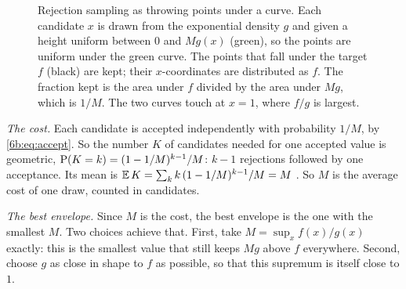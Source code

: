 \begin{figure}[htbp]
\centering
{}
\caption{Rejection sampling as throwing points under a curve. Each candidate $x$ is
drawn from the exponential density $g$ and given a height uniform between $0$ and
$Mg(x)$ (green), so the points are uniform under the green curve. The points that
fall under the target $f$ (black) are kept; their $x$-coordinates are distributed as
$f$. The fraction kept is the area under $f$ divided by the area under $Mg$, which is
$1/M$. The two curves touch at $x=1$, where $f/g$ is largest.}
\label{6b:fig:reject-geom}
\end{figure}

\emph{The cost.} Each candidate is accepted independently with probability $1/M$,
by \eqref{6b:eq:accept}.
So the number $K$ of candidates needed for one accepted value is geometric,
$\operatorname{P}(K=k)=(1-1/M)^{k-1}/M$: $k-1$ rejections followed by one acceptance. Its mean
is $\E K=\sum_k k\,(1-1/M)^{k-1}/M=M$ . So $M$ is
the average cost of one draw, counted in candidates.

\emph{The best envelope.} Since $M$ is the cost, the best envelope is the one with
the smallest $M$. Two choices achieve that. First, take $M=\sup_x f(x)/g(x)$
exactly: this is the smallest value that still keeps $Mg$ above $f$ everywhere.
Second, choose $g$ as close in shape to $f$ as possible, so that this supremum is
itself close to $1$.

